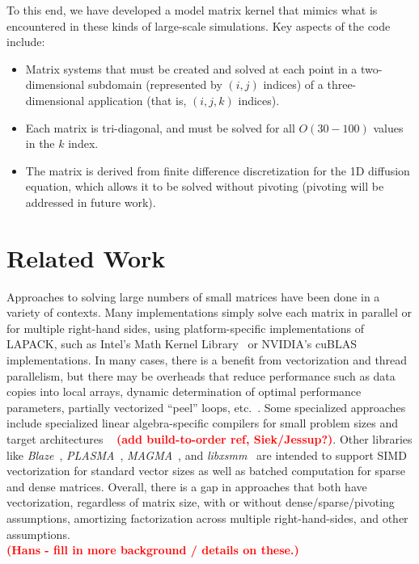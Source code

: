 \documentclass[conference]{IEEEtran}
\newcommand{\fix}[1]{{\bf \textcolor {red}{#1}}}
\begin{document}
To this end, we have developed a model matrix kernel that mimics what
  is encountered in these kinds of large-scale simulations.
Key aspects of the code include:
\begin{itemize}
\item Matrix systems that must be created and solved
  at each point in a two-dimensional subdomain (represented by $(i,j)$ indices)
  of a three-dimensional application (that is, $(i,j,k)$ indices).
\item Each matrix is tri-diagonal, and must be solved for all $O(30-100)$
  values in the $k$ index.
\item The matrix is derived from finite difference discretization for the
  1D diffusion equation, which allows it to be solved without pivoting
  (pivoting will be addressed in future work).
\end{itemize}

\section{Related Work}
Approaches to solving large numbers of small matrices have been done
  in a variety of contexts.
Many implementations simply solve each matrix in parallel or for multiple
  right-hand sides, using platform-specific
  implementations of LAPACK, such as Intel's Math Kernel Library~\cite{mkl_website}
  or NVIDIA's cuBLAS~\cite{cublas_website} implementations.
In many cases, there is a benefit from vectorization and thread parallelism, 
  but there may be overheads that reduce performance such as data copies
  into local arrays, dynamic determination of optimal performance parameters, 
  partially vectorized ``peel'' loops, etc.~\cite{??}.
Some specialized approaches include specialized linear algebra-specific 
  compilers for small problem sizes and target architectures 
 ~\cite{Spampinato:2014, ??} \fix{(add build-to-order ref, Siek/Jessup?)}.
Other libraries like 
  \emph{Blaze}~\cite{BlazeSite}, 
  \emph{PLASMA}~\cite{PLASMASite},
  \emph{MAGMA}~\cite{Haidar:2015}, and 
  \emph{libxsmm}~\cite{libxsmm_website}
  are intended to support SIMD vectorization for standard vector sizes
  as well as batched computation for sparse and dense matrices.
Overall, there is a gap in approaches that both have vectorization,
  regardless of matrix size, with or without dense/sparse/pivoting 
  assumptions, amortizing factorization across multiple right-hand-sides, 
  and other assumptions.
\\
\fix{(Hans - fill in more background / details on these.)}
\end{document}
